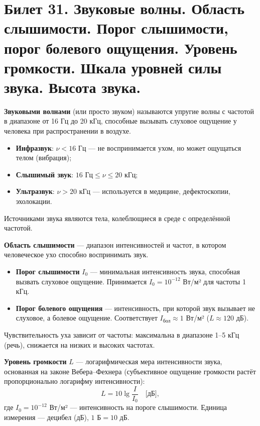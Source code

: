 \section{Билет 31. Звуковые волны. Область слышимости. Порог слышимости, порог болевого ощущения. Уровень громкости. Шкала уровней силы звука. Высота звука.}

\begin{definition}
\textbf{Звуковыми волнами} (или просто звуком) называются упругие волны с частотой в диапазоне от 16 Гц до 20 кГц, способные вызывать слуховое ощущение у человека при распространении в воздухе.
\begin{itemize}
    \item \textbf{Инфразвук}: $\nu < 16$ Гц --- не воспринимается ухом, но может ощущаться телом (вибрация);
    \item \textbf{Слышимый звук}: $16 \text{ Гц} \le \nu \le 20 \text{ кГц}$;
    \item \textbf{Ультразвук}: $\nu > 20$ кГц --- используется в медицине, дефектоскопии, эхолокации.
\end{itemize}
Источниками звука являются тела, колеблющиеся в среде с определённой частотой.
\end{definition}

\begin{definition}
\textbf{Область слышимости} --- диапазон интенсивностей и частот, в котором человеческое ухо способно воспринимать звук.
\begin{itemize}
    \item \textbf{Порог слышимости} $I_0$ --- минимальная интенсивность звука, способная вызвать слуховое ощущение. Принимается $I_0 = 10^{-12}$ Вт/м² для частоты 1 кГц.
    \item \textbf{Порог болевого ощущения} --- интенсивность, при которой звук вызывает не слуховое, а болевое ощущение. Соответствует $I_{\text{бол}} \approx 1$ Вт/м² ($L \approx 120$ дБ).
\end{itemize}
Чувствительность уха зависит от частоты: максимальна в диапазоне 1--5 кГц (речь), снижается на низких и высоких частотах.
\end{definition}

\begin{definition}
\textbf{Уровень громкости} $L$ --- логарифмическая мера интенсивности звука, основанная на законе Вебера--Фехнера (субъективное ощущение громкости растёт пропорционально логарифму интенсивности):
\begin{equation}
    L = 10 \lg \frac{I}{I_0} \quad \text{[дБ]}, \label{eq:loudness_level_31}
\end{equation}
где $I_0 = 10^{-12}$ Вт/м² --- интенсивность на пороге слышимости. Единица измерения --- децибел (дБ), $1 \text{ Б} = 10 \text{ дБ}$.
\end{definition}

